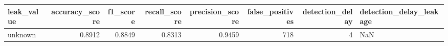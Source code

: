 \begin{tabular}{lrrrrrrl}
\toprule
leak\_value & accuracy\_score & f1\_score & recall\_score & precision\_score & false\_positives & detection\_delay & detection\_delay\_leakage \\
\midrule
unknown & 0.8912 & 0.8849 & 0.8313 & 0.9459 & 718 & 4 & NaN \\
\bottomrule
\end{tabular}
